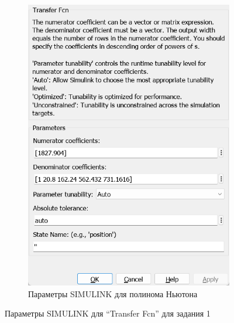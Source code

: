 \documentclass[a4paper, 12pt]{article}
\begin{document}
\begin{figure}[H]
\begin{subfigure}{0.3\textwidth}
            \includegraphics[width=\linewidth]{task1_newton_window.png}
            \caption{Параметры SIMULINK для полинома Ньютона}
            \label{fig:t1nw}
        \end{subfigure}
        \caption{Параметры SIMULINK для ``Transfer Fcn'' для задания 1}
        \label{fig:windows1}
    \end{figure}
\end{document}
